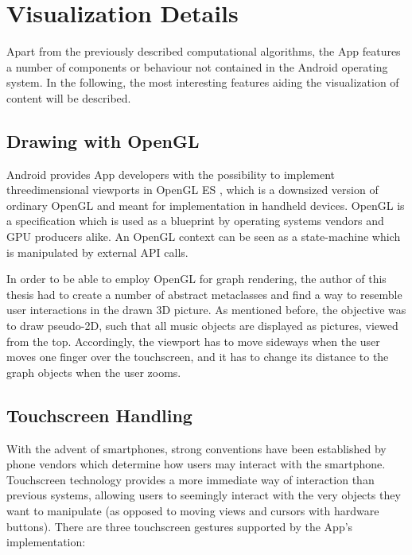 \section{Visualization Details}

Apart from the previously described computational algorithms, the App features a number of components or behaviour not contained in the Android operating system. In the following, the most interesting features aiding the visualization of content will be described.

\subsection{Drawing with OpenGL}

Android provides App developers with the possibility to implement threedimensional viewports in OpenGL ES \cite{url:opengles}, which is a downsized version of ordinary OpenGL and meant for implementation in handheld devices. OpenGL is a specification which is used as a blueprint by operating systems vendors and GPU producers alike. An OpenGL context can be seen as a state-machine which is manipulated by external API calls.

In order to be able to employ OpenGL for graph rendering, the author of this thesis had to create a number of abstract metaclasses and find a way to resemble user interactions in the drawn 3D picture. As mentioned before, the objective was to draw pseudo-2D, such that all music objects are displayed as pictures, viewed from the top. Accordingly, the viewport has to move sideways when the user moves one finger over the touchscreen, and it has to change its distance to the graph objects when the user zooms.

\subsection{Touchscreen Handling}

With the advent of smartphones, strong conventions have been established by phone vendors which determine how users may interact with the smartphone. Touchscreen technology provides a more immediate way of interaction than previous systems, allowing users to seemingly interact with the very objects they want to manipulate (as opposed to moving views and cursors with hardware buttons).
There are three touchscreen gestures supported by the App's implementation:

